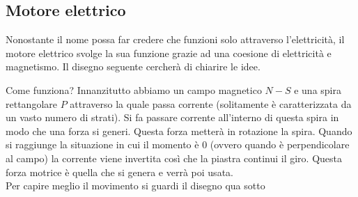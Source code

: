   \subsection{Motore elettrico}
  Nonostante il nome possa far credere che funzioni solo attraverso l'elettricità, il motore elettrico 
  svolge la sua funzione grazie ad una coesione di elettricità e magnetismo. Il disegno seguente 
  cercherà di chiarire le idee.
  \begin{center}
  \end{center}
  Come funziona? Innanzitutto abbiamo un campo magnetico $N-S$ e una spira rettangolare $P$ attraverso 
  la quale passa corrente (solitamente è caratterizzata da un vasto numero di strati). Si fa passare 
  corrente all'interno di questa spira in modo che una forza si generi. Questa forza metterà in 
  rotazione la spira. Quando si raggiunge la situazione in cui il momento è $0$ (ovvero quando è 
  perpendicolare al campo) la corrente viene invertita così che la piastra continui il giro. Questa 
  forza motrice è quella che si genera e verrà poi usata.\\
  Per capire meglio il movimento si guardi il disegno qua sotto
